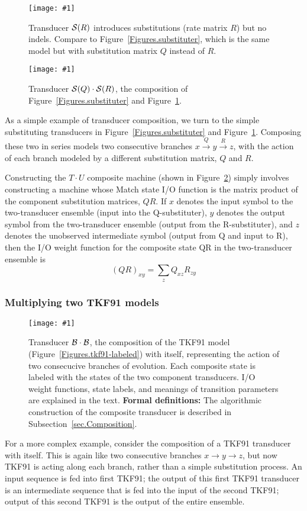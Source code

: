 \documentclass{article}
\newcommand{\secref}[1]{Subsection~\ref{sec.#1}}
\newcommand{\figref}[1]{Figure~\ref{Figures.#1}}
\newcommand{\figlabel}[1]{\label{Figures.#1}}
\newcommand{\easyfig}[4]{
\begin{figure}
\texttt{[image: \#1]}
\caption{ \figlabel{#3} #4}
\end{figure}}
\newcommand{\pdffig}[2]{\easyfig{#1-fig.pdf}{}{#1}{#2}}
\newcommand{\widepdffig}[2]{\easyfig{#1-fig.pdf}{width=\textwidth}{#1}{#2}}
\newcommand\substitute{{\cal S}}
\newcommand\tkf{{\cal B}}
\newcommand\formaldefs{{\bf Formal definitions: }}
\begin{document}
\pdffig{substituter2}{Transducer $\substitute(R)$ introduces substitutions (rate matrix $R$) but no indels. Compare to \figref{substituter}, which is the same model but with substitution matrix $Q$ instead of $R$.}

\pdffig{substituter-substituter2}{Transducer $\substitute(Q) \cdot \substitute(R)$, the composition of \figref{substituter} and \figref{substituter2}.}

As a simple example of transducer composition, we turn to the simple substituting transducers
in \figref{substituter} and \figref{substituter2}.  
Composing these two in series models two consecutive branches 
 $x \stackrel{Q}{\to} y \stackrel{R}{\to} z$, with 
the action of each branch modeled by a different substitution matrix, $Q$ and $R$.  

Constructing the $T \cdot U$ composite machine 
 (shown in \figref{substituter-substituter2})
simply involves constructing a machine whose Match state I/O function
 is the matrix product of the component substitution matrices, $QR$.  
If $x$ denotes the input symbol to the two-transducer ensemble (input into the Q-substituter),
$y$ denotes the output symbol from the two-transducer ensemble (output from the R-substituter),
and $z$ denotes the unobserved intermediate symbol (output from Q and input to R),
then the I/O weight function for the composite state QR in the two-transducer ensemble is
\[
(QR)_{xy} = \sum_z Q_{xz} R_{zy}
\]



\subsubsection{Multiplying two TKF91 models}

\widepdffig{tkf91-tkf91}{Transducer $\tkf \cdot \tkf$, the composition of the 
TKF91 model (\figref{tkf91-labeled}) with itself, representing the action of
 two consecucive branches of evolution.
Each composite state is labeled with the states of the two component transducers.  
I/O weight functions, state labels, and meanings of transition parameters are explained in the text. 
\formaldefs
The algorithmic construction of the composite transducer is described in \secref{Composition}.
}

For a more complex example, consider the composition of a TKF91 transducer with itself.  
This is again like two consecutive branches $x \to y \to z$, 
but now TKF91 is acting along each branch, rather than a simple substitution process. 
An input sequence is fed into first TKF91; 
the output of this first TKF91 transducer is an intermediate sequence
 that is fed into the input of the second TKF91;
output of this second TKF91 is the output of the entire ensemble.
\end{document}
